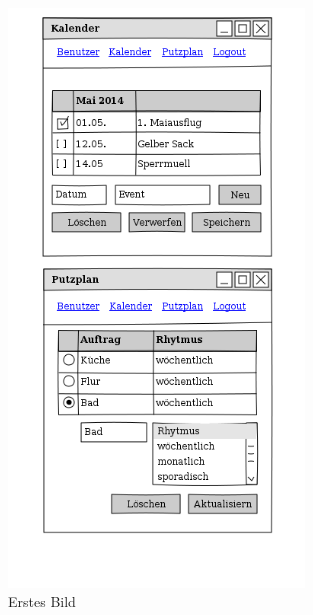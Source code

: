 \begin{figure}[htbp] 
  \centering
     \includegraphics[width=0.7\textwidth]{anhang/mockups/webpage_1.png}
  \caption{Erstes Bild}
  \label{fig:Bild1}
\end{figure}

